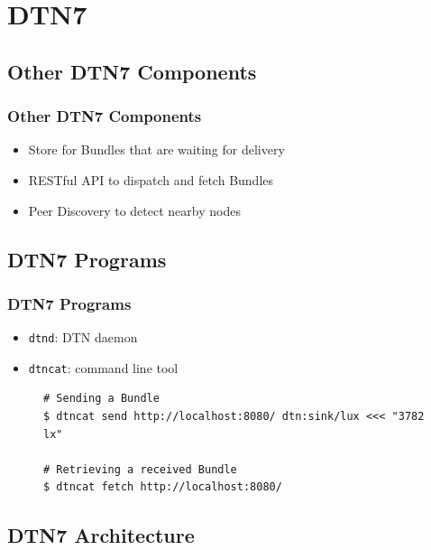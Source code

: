 \section{DTN7}

\subsection{Other DTN7 Components}

\begin{frame}
  \frametitle{Other DTN7 Components}

  \begin{itemize}
  \item Store for Bundles that are waiting for delivery
  \item RESTful API to dispatch and fetch Bundles
  \item Peer Discovery to detect nearby nodes
  \end{itemize}
\end{frame}

\subsection{DTN7 Programs}

\begin{frame}[fragile]
  \frametitle{DTN7 Programs}

  \begin{itemize}
  \item \texttt{dtnd}: \acs{DTN} daemon
  \item \texttt{dtncat}: command line tool
  \end{itemize}

  \begin{figure}

    \begin{lstlisting}
# Sending a Bundle
$ dtncat send http://localhost:8080/ dtn:sink/lux <<< "3782 lx"

# Retrieving a received Bundle
$ dtncat fetch http://localhost:8080/
    \end{lstlisting}
  \end{figure}
\end{frame}

\subsection{DTN7 Architecture}

